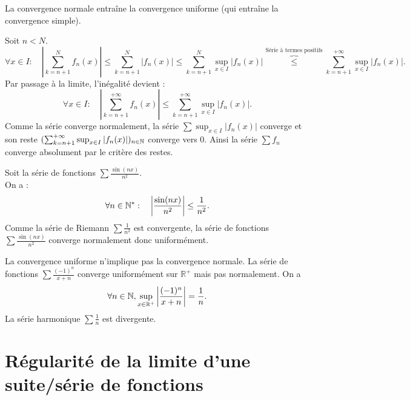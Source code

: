 \documentclass{book}
\newcommand{\Sfn}{\sum f_n}
\begin{document}
\begin{Proposition}
La convergence normale entraîne la convergence uniforme (qui entraîne la convergence simple).
\end{Proposition}
\begin{Demonstration}
Soit $n<N$.
$$\forall  x\in I:\quad  \left|\sum_{k=n+1}^{N} f_n(x)\right|\leq  \sum_{k=n+1}^{N} \left|f_n(x)\right|   \leq  \sum_{k=n+1}^{N} \sup_{x\in I} \left|f_n(x)\right|  \overbrace{\leq}^{\text{Série à termes positifs}} \sum_{k=n+1}^{+\infty} \sup_{x\in I} \left|f_n(x)\right|. $$ 
Par passage à la limite, l'inégalité devient :
 $$\forall  x\in I:\quad  \left|\sum_{k=n+1}^{+\infty} f_n(x)\right|\leq  \sum_{k=n+1}^{+\infty} \sup_{x\in I} \left|f_n(x)\right| . $$ 
Comme la série converge normalement, la série $\sum \sup_{x\in I} \left|f_n(x)\right|$ converge et son reste $(\sum_{k=n+1}^{+\infty}  \sup_{x\in I} \left|f_n(x)\right| )_{n\in\mathbb{N}}$ converge vers 0. Ainsi la série $\Sfn$ converge absolument par le critère des restes. 
\end{Demonstration}
\begin{Exemple}Soit la série de fonctions $\sum \frac{\sin(nx)}{n^2}$.\\
On a :
$$\forall n\in\mathbb{N}^* :\quad \left|\frac{\sin(nx)}{n^2}\right|\leq \frac{1}{n^2}.$$
Comme la série de Riemann $\sum \frac{1}{n^2}$ est convergente,  la série de fonctions $\sum \frac{\sin(nx)}{n^2}$ converge normalement donc uniformément.
\end{Exemple}
\begin{Remarque}La convergence uniforme n'implique pas la convergence normale. La série de fonctions $\sum \frac{(-1)^n}{x+n}$ converge uniformément sur $\mathbb{R}^+$ mais pas normalement. On a$$ \forall  n\in \mathbb{N}   , \sup_{x\in \mathbb{R}^+}\left| \frac{(-1)^n}{x+n}\right|=\frac{1}{n}.$$ La série harmonique $\sum \frac{1}{n}$ est divergente.
\end{Remarque}

\section{Régularité de la limite d'une suite/série de fonctions}
\end{document}
